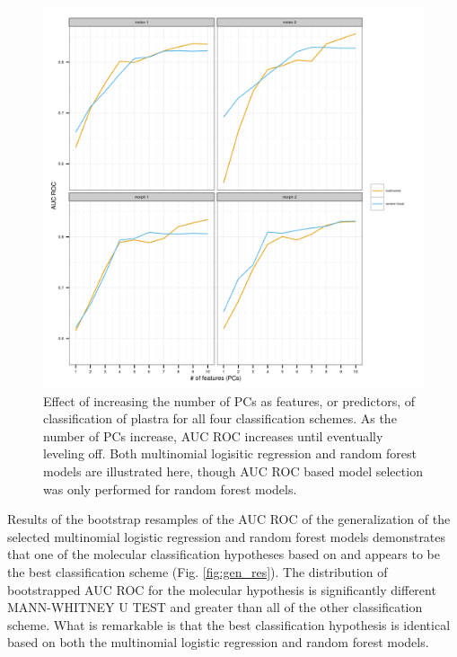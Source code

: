 \documentclass[12pt]{article}\usepackage{graphicx, color}
\begin{document}
\begin{figure}[ht]
  \centering
  \includegraphics[width = \textwidth]{figure/roc_sel}
  \caption{Effect of increasing the number of PCs as features, or predictors, of classification of plastra for all four classification schemes. As the number of PCs increase, AUC ROC increases until eventually leveling off. Both multinomial logisitic regression and random forest models are illustrated here, though AUC ROC based model selection was only performed for random forest models.}
  \label{fig:roc}
\end{figure}


Results of the bootstrap resamples of the AUC ROC of the generalization of the selected multinomial logistic regression and random forest models demonstrates that one of the molecular classification hypotheses based on \citet{Spinks2005} and \citet{Spinks2010} appears to be the best classification scheme (Fig. \ref{fig:gen_res}). The distribution of bootstrapped AUC ROC for the molecular hypothesis is significantly different MANN-WHITNEY U TEST and greater than all of the other classification scheme. What is remarkable is that the best classification hypothesis is identical based on both the multinomial logistic regression and random forest models.
\end{document}
